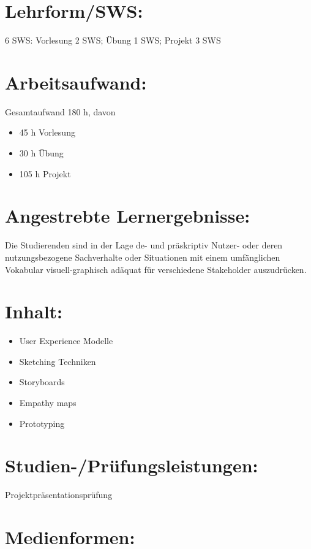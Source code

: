 \section*{Lehrform/SWS:}\label{lehrformsws-13}

6 SWS: Vorlesung 2 SWS; Übung 1 SWS; Projekt 3 SWS

\section*{Arbeitsaufwand:}\label{arbeitsaufwand-13}

Gesamtaufwand 180 h, davon

\begin{itemize}
\item
  45 h Vorlesung
\item
  30 h Übung
\item
  105 h Projekt
\end{itemize}

\section*{Angestrebte
Lernergebnisse:}\label{angestrebte-lernergebnisse-13}

Die Studierenden sind in der Lage de- und präskriptiv Nutzer- oder deren
nutzungsbezogene Sachverhalte oder Situationen mit einem umfänglichen
Vokabular visuell-graphisch adäquat für verschiedene Stakeholder
auszudrücken.

\section*{Inhalt:}\label{inhalt-13}

\begin{itemize}
\item
  User Experience Modelle
\item
  Sketching Techniken
\item
  Storyboards
\item
  Empathy maps
\item
  Prototyping
\end{itemize}

\section*{Studien-/Prüfungsleistungen:}\label{studien-pruxfcfungsleistungen-13}

Projektpräsentationsprüfung

\section*{Medienformen:}\label{medienformen-13}

